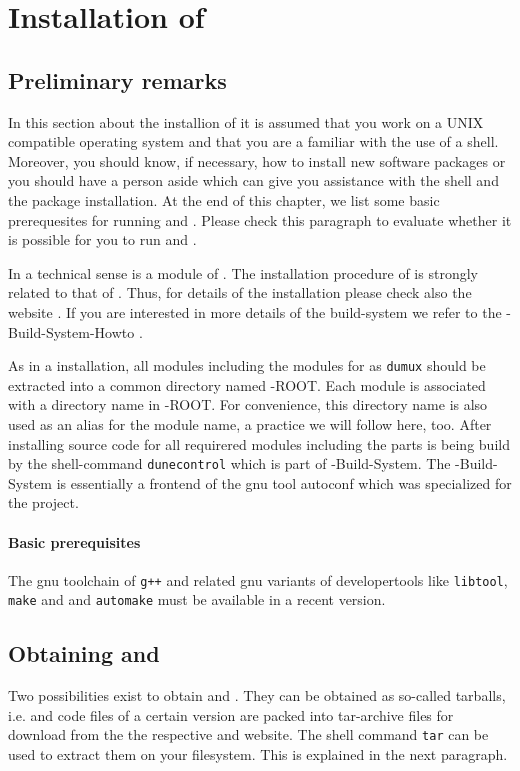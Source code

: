 \section{Installation of \Dumux} \label{install}
\subsection{Preliminary remarks}

In this section about the installion of \Dumux it is assumed that you work on a UNIX compatible operating system and that you are a familiar with the use of a shell. Moreover, you should know,  if necessary, how to install
new software packages or you should have a person aside which can give you assistance with the shell and
the package installation. At the end of this chapter, we list some basic prerequesites for running \Dune and \Dumux. Please check this paragraph to evaluate whether it is possible for you to run \Dune and \Dumux.

In a technical sense \Dumux is a module of \Dune. The installation procedure of \Dumux is strongly related to 
that of \Dune.  Thus, for details of the installation please check also the {\Dune} website \cite{DUNE-HP}. If you are interested in more details of the build-system we refer to the {\Dune}-Build-System-Howto \cite{DUNE-HP}.

As in a \Dune installation, all \Dune modules including the modules for \Dumux as \texttt{dumux} should be extracted into a common directory named {\Dune}-ROOT. Each \Dune module is associated with a directory name in {\Dune}-ROOT. For convenience, this directory name is  also used as an alias for the module name, a practice we will follow here, too.
After installing source code for all requirered \Dune modules including the \Dumux parts
\Dune is being build by the shell-command \texttt{dunecontrol} which is part of {\Dune}-Build-System. The {\Dune}-Build-System is essentially a frontend of the gnu tool autoconf which was specialized for the \Dune project.

\paragraph{Basic prerequisites} \label{prerequisites}
The gnu toolchain of \texttt{g++}  and related gnu variants of developertools like \texttt{libtool}, \texttt{make} and
and \texttt{automake} must be available in a recent version.

\subsection{Obtaining \Dune and \Dumux}
Two possibilities exist to obtain \Dune and \Dumux. They can be obtained as so-called tarballs, i.e. \Dumux and \Dune code files of a certain version are packed into tar-archive files for download from the the respective {\Dune} and {\Dumux} website. The shell command \texttt{tar} can be used to extract them on your filesystem. This is explained in the next paragraph. 

